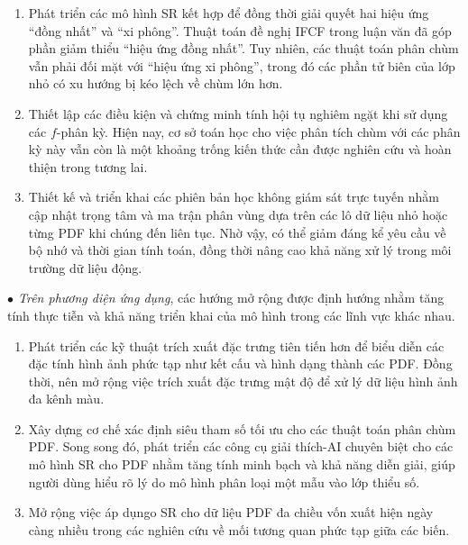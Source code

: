 \documentclass[a4paper,oneside]{book} %
\theoremstyle{plain}
\theoremstyle{plain}
\theoremstyle{nonumberplain}
\begin{document}
\begin{enumerate}[label=(\roman*), leftmargin=2em, itemsep=1ex]
	\item {Phát triển các mô hình SR kết hợp} để đồng thời giải quyết hai hiệu ứng “đồng nhất” và “xi phông”. Thuật toán đề nghị IFCF trong luận văn đã góp phần giảm thiểu “hiệu ứng đồng nhất”. Tuy nhiên, các thuật toán phân chùm vẫn phải đối mặt với “hiệu ứng xi phông”, trong đó các phần tử biên của lớp nhỏ có xu hướng bị kéo lệch về chùm lớn hơn.
	
	\item {Thiết lập các điều kiện và chứng minh tính hội tụ nghiêm ngặt} khi sử dụng các $f$-phân kỳ. Hiện nay, cơ sở toán học cho việc phân tích chùm với các phân kỳ này vẫn còn là một khoảng trống kiến thức cần được nghiên cứu và hoàn thiện trong tương lai.
	
	\item {Thiết kế và triển khai các phiên bản học không giám sát trực tuyến} nhằm cập nhật trọng tâm và ma trận phân vùng dựa trên các lô dữ liệu nhỏ hoặc từng PDF khi chúng đến liên tục. Nhờ vậy, có thể giảm đáng kể yêu cầu về bộ nhớ và thời gian tính toán, đồng thời nâng cao khả năng xử lý trong môi trường dữ liệu động.
\end{enumerate}




\textit{$\bullet$ Trên phương diện ứng dụng}, các hướng mở rộng được định hướng nhằm tăng tính thực tiễn và khả năng triển khai của mô hình trong các lĩnh vực khác nhau.
\begin{enumerate}[label=(\roman*), leftmargin=2em, itemsep=1ex]	
	\item Phát triển các kỹ thuật trích xuất đặc trưng tiên tiến hơn để biểu diễn các đặc tính hình ảnh phức tạp như kết cấu và hình dạng thành các PDF. Đồng thời, nên mở rộng việc trích xuất đặc trưng mật độ để xử lý dữ liệu hình ảnh đa kênh màu.
	\item Xây dựng cơ chế xác định siêu tham số tối ưu cho các thuật toán phân chùm PDF. Song song đó, phát triển các công cụ giải thích-AI chuyên biệt cho các mô hình SR cho PDF nhằm tăng tính minh bạch và khả năng diễn giải, giúp người dùng hiểu rõ lý do mô hình phân loại một mẫu vào lớp thiểu số.
	\item Mở rộng việc áp dụngo SR cho dữ liệu PDF đa chiều vốn xuất hiện ngày càng nhiều trong các nghiên cứu về mối tương quan phức tạp giữa các biến.
\end{enumerate}
\end{document}
